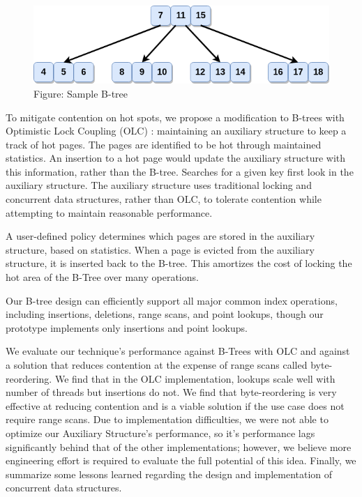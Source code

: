 \documentclass[twocolumn]{article}
\begin{document}
\begin{figure}[ht]
\includegraphics[width=\columnwidth]{figures/btree_contention_example.png}
\caption{Figure: Sample B-tree\label{ex}}
\end{figure}

To mitigate contention on hot spots, we propose a modification to B-trees with
Optimistic Lock Coupling (OLC) \cite{art}: maintaining an auxiliary structure to keep
a track of hot pages. The pages are identified to be hot through maintained
statistics. An insertion to a hot page would update the auxiliary structure
with this information, rather than the B-tree. Searches for a given key first
look in the auxiliary structure. The auxiliary structure uses traditional
locking and concurrent data structures, rather than OLC, to tolerate contention
while attempting to maintain reasonable performance.

A user-defined policy determines which pages are stored in the auxiliary
structure, based on statistics. When a page is evicted from the auxiliary
structure, it is inserted back to the B-tree. This amortizes the cost of
locking the hot area of the B-Tree over many operations.

Our B-tree design can efficiently support all major common index operations,
including insertions, deletions, range scans, and point lookups, though our
prototype implements only insertions and point lookups.

We evaluate our technique’s performance against B-Trees with OLC and against a
solution that reduces contention at the expense of range scans called
byte-reordering. We find that in the OLC implementation, lookups scale well
with number of threads but insertions do not. We find that byte-reordering is
very effective at reducing contention and is a viable solution if the use case
does not require range scans. Due to implementation difficulties, we were not
able to optimize our Auxiliary Structure’s performance, so it’s performance
lags significantly behind that of the other implementations; however, we
believe more engineering effort is required to evaluate the full potential of
this idea. Finally, we summarize some lessons learned regarding the design and
implementation of concurrent data structures.
\end{document}
